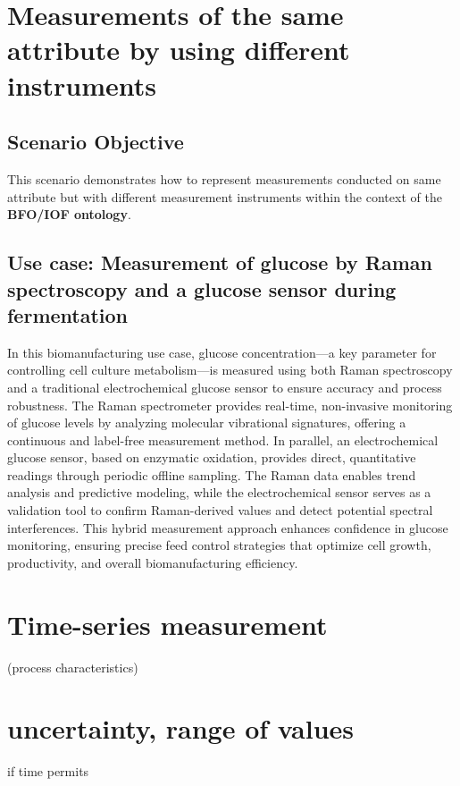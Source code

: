 \section{Measurements of the same attribute by using different instruments}

\subsection*{Scenario Objective}

This scenario demonstrates how to represent measurements conducted on same attribute but with different measurement instruments within the context of the \textbf{BFO/IOF ontology}.
\subsection{Use case: Measurement of glucose by Raman spectroscopy and a glucose sensor during fermentation}
In this biomanufacturing use case, glucose concentration—a key parameter for controlling cell culture metabolism—is measured using both Raman spectroscopy and a traditional electrochemical glucose sensor to ensure accuracy and process robustness. The Raman spectrometer provides real-time, non-invasive monitoring of glucose levels by analyzing molecular vibrational signatures, offering a continuous and label-free measurement method. In parallel, an electrochemical glucose sensor, based on enzymatic oxidation, provides direct, quantitative readings through periodic offline sampling. The Raman data enables trend analysis and predictive modeling, while the electrochemical sensor serves as a validation tool to confirm Raman-derived values and detect potential spectral interferences. 
This hybrid measurement approach enhances confidence in glucose monitoring, ensuring precise feed control strategies that optimize cell growth, productivity, and overall biomanufacturing efficiency.

\section{Time-series measurement}
(process characteristics)

\section{uncertainty, range of values}
if time permits

